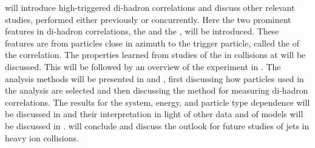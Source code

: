  will introduce high-\pT triggered di-hadron correlations and discuss other relevant studies, performed either previously or concurrently.  Here the two prominent features in di-hadron correlations, the \jlc and the \ridge, will be introduced.  These features are from particles close in azimuth to the trigger particle, called the \ns of the correlation.  The properties learned from studies of the \ns in \Au collisions at \sNNtwohundred will be discussed.  This will be followed by an overview of the experiment in .  The analysis methods will be presented in  and , first discussing how particles used in the analysis are selected and then discussing the method for measuring di-hadron correlations.  The results for the system, energy, and particle type dependence will be discussed in  and their interpretation in light of other data and of models will be discussed in .   will conclude and discuss the outlook for future studies of jets in heavy ion collisions.
